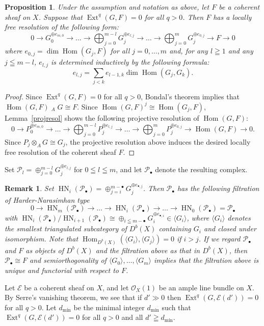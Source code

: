 \documentclass[a4paper,12pt]{amsart}
\newtheorem{prop}[thm]{Proposition}%
\newtheorem{rmk}[thm]{Remark}%
\DeclareMathOperator{\Hom}{Hom}
\DeclareMathOperator{\Ext}{Ext}
\DeclareMathOperator{\lotimes}{\otimes^{\mathbb{L}}}
\DeclareMathOperator{\HN}{HN}
\begin{document}
\begin{prop}
\label{general resolution}
Under the assumption and notation as above,
let $F$ be a coherent sheaf on $X$.
Suppose that 
$\Ext^q(G,F)=0$ for all $q>0$.
Then $F$ has a locally free resolution of the following form:
\[0\to G_0^{\oplus e_{m,0}}\to\dots\to \bigoplus_{j=0}^{m-l}G_{j}^{\oplus e_{l,j}}\to\dots\to
\bigoplus_{j=0}^{m}G_{j}^{\oplus e_{0,j}}\to F\to 0\]
where $e_{0,j}=\dim \Hom(G_j,F)$ for all $j=0,\dots,m$
and, for any $l\geqq 1$ and any $j\leqq m-l$, $e_{l,j}$ is determined inductively by the following formula:
\[e_{l,j}=\sum_{j<k}e_{l-1,k}\dim \Hom(G_j,G_k).\]
\end{prop}
\begin{proof}
Since $\Ext^q(G,F)=0$ for all $q>0$,
Bondal's theorem \cite[Theorem 6.2]{MR992977} implies that  $\Hom(G, F)\lotimes_A G\cong F$.
Since $\Hom(G,F)^j\cong \Hom(G_j,F)$,
Lemma~\ref{projresol} shows 
the following projective resolution of $\Hom (G,F)$:
\[0\to P_0^{\oplus e_{m,0}}\to\dots\to \bigoplus_{j=0}^{m-l}P_{j}^{\oplus e_{l,j}}\to\dots\to
\bigoplus_{j=0}^{m}P_{j}^{\oplus e_{0,j}}\to \Hom(G,F)\to 0.\]
Since $P_j\otimes_AG\cong G_j$, the projective resolution above
induces the desired locally free resolution
of the coherent sheaf $F$.
\end{proof}


Set $\mathcal{P}_l=\oplus_{j=0}^{m-l}G_{j}^{\oplus e_{l,j}}$
for $0\leqq l\leqq m$,
and let $\mathcal{P}_{\bullet}$ denote the resulting complex.


\begin{rmk}
Set 
$\HN_i(\mathcal{P}_{\bullet})=
\oplus_{j=i}^{m-\bullet}
G_j^{\oplus e_{\bullet,j}}$.
Then $\mathcal{P}_{\bullet}$ has the following filtration of Harder-Narasimhan type
\[0\to \HN_m(\mathcal{P}_{\bullet})\to \dots \to \HN_i(\mathcal{P}_{\bullet})\to \dots\to \HN_0(\mathcal{P}_{\bullet})=\mathcal{P}_{\bullet}\]
with 
$\HN_{i}(\mathcal{P}_{\bullet})/\HN_{i+1}(\mathcal{P}_{\bullet})\cong 
\oplus_{i\leqq m-\bullet}G_i^{\oplus e_{\bullet,i}}\in \langle G_i\rangle
$,
where $\langle G_i\rangle$ denotes the smallest triangulated subcategory of $D^b(X)$ containing $G_i$ 
and closed under isomorphism.
Note that $\Hom_{D^b(X)}(\langle G_i\rangle,\langle G_j\rangle)=0$ if $i>j$.
If we regard $\mathcal{P}_{\bullet}$ and $F$ as objects of $D^b(X)$
and the filtration above as that in $D^b(X)$, 
then $\mathcal{P}_{\bullet}\cong F$ and semiorthogonality of 
$\langle G_0\rangle,\dots,\langle G_m\rangle$ implies that 
the filtration above is unique and functorial with respect to $F$.
\end{rmk}
Let $\mathcal{E}$ be a coherent sheaf on $X$,
and let $\mathcal{O}_X(1)$ be an ample line bundle on $X$.
By Serre's vanishing theorem,
we see that if $d'\gg 0$ then $\Ext^q(G,\mathcal{E}(d'))=0$ for all $q>0$.
Let $d_{\min}$ be the minimal integer $d_{\min}$ 
such that 
$\Ext^q(G,\mathcal{E}(d'))=0$ for all $q>0$ and all $d'\geqq d_{\min}$.
\end{document}
